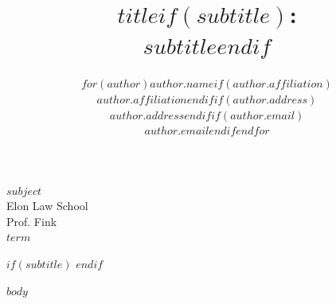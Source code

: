 \documentclass[$fontsize$,letterpaper,twoside]{article}
\title{\Large\textbf{{$title$}$if(subtitle)$:\\$subtitle$$endif$}}
\author{$for(author)${$author.name$}$if(author.affiliation)$\\$author.affiliation$$endif$$if(author.address)$\\$author.address$$endif$$if(author.email)$\\$author.email$$endif$$endfor$}
\date{}
\begin{document}
\color{OffBlack}
\singlespacing
{}

\thispagestyle{empty}
\begin{small}
$subject$ \\
Elon Law School \\
Prof. Fink \\
$term$ 
\end{small}
\begin{center}
$if(subtitle)$
$endif$
\end{center}

$body$
\end{document}
